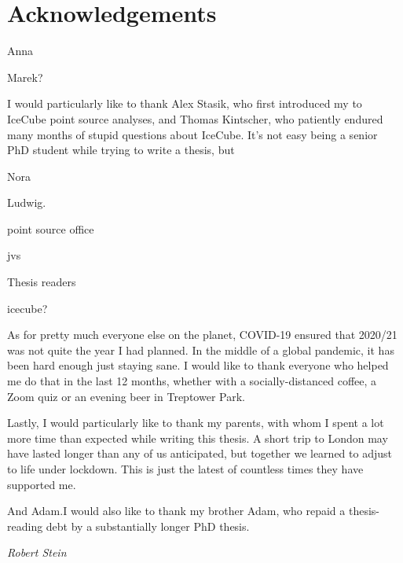 \chapter*{Acknowledgements}

Anna

Marek?

I would particularly like to thank Alex Stasik, who first introduced my to IceCube point source analyses, and Thomas Kintscher, who patiently endured many months of stupid questions about IceCube. It's not easy being a senior PhD student while trying to write a thesis, but  

Nora 

Ludwig.

point source office 

jvs

Thesis readers

icecube?

As for pretty much everyone else on the planet, COVID-19 ensured that 2020/21 was not quite the year I had planned. In the middle of a global pandemic, it has been hard enough just staying sane. I would like to thank everyone who helped me do that in the last 12 months, whether with a socially-distanced coffee, a Zoom quiz or an evening beer in Treptower Park.

Lastly, I would particularly like to thank my parents, with whom I spent a lot more time than expected while writing this thesis. A short trip to London may have lasted  longer than any of us anticipated, but together we learned to adjust to life under lockdown. This is just the latest of countless times they have supported me.

And Adam.I would also like to thank my brother Adam, who repaid a thesis-reading debt by  a substantially longer PhD thesis. 

\begin{flushright}
	\textit{Robert Stein}
\end{flushright}
